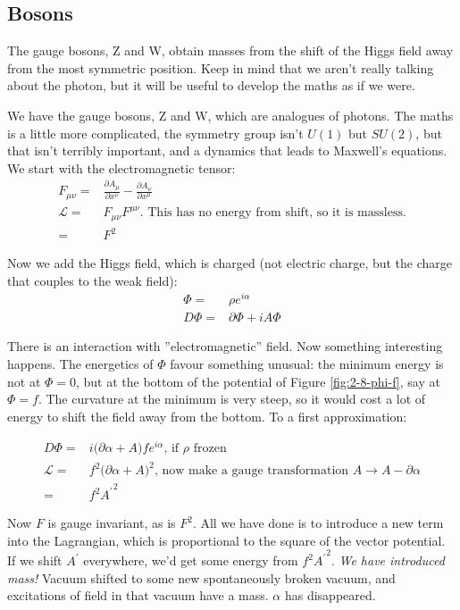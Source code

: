 \documentclass[]{article}
\begin{document}
\subsection{Bosons}

The gauge bosons, Z and W, obtain masses from the shift of the Higgs field away from the most symmetric position. Keep in mind that we aren't really talking about the photon, but it will be useful to develop the maths as if we were.

We have the gauge bosons, Z and W, which are analogues of photons. The maths is a little more complicated, the symmetry group isn't $U(1)$ but $SU(2)$, but that isn't terribly important, and a dynamics that leads to Maxwell's equations. We start with the electromagnetic tensor:
\begin{align*}
	F_{\mu\nu}=&\frac{\partial A_\mu}{\partial x^\nu}-\frac{\partial A_\nu}{\partial x^\mu}\\
	\mathcal{L} =& F_{\mu\nu} F^{\mu\nu} \text{. This has no energy from shift, so it is massless.}\\
	=& F^2
\end{align*}

Now we add the Higgs field, which is charged (not electric charge, but the charge that couples to the weak field):
\begin{align*}
	\Phi =& \rho e^{i \alpha}\\
	D \Phi =& \partial \Phi + i A \Phi 
\end{align*}

There is an interaction with ''electromagnetic'' field. Now something interesting happens. The energetics of $\Phi$ favour something unusual: the minimum energy is not at $\Phi=0$, but at the bottom of the potential of Figure \ref{fig:2-8-phi-f}, say at $\Phi=f$. The curvature at the minimum is very steep, so it would cost a lot of energy to shift the field away from the bottom. To a first approximation:

\begin{align*}
	D \Phi =& i \big( \partial \alpha + A \big) f e^{i \alpha} \text{, if $\rho$ frozen}\\
	\mathcal{L} =& f^2 \big(\partial \alpha + A \big)^2 \text{, now make a gauge transformation $A\rightarrow A - \partial \alpha$}\\
	=& f^2 {A^\prime}^2
\end{align*}

Now $F$ is gauge invariant, as is $F^2$. All we have done is to introduce a new term into the Lagrangian, which is proportional to the square of the vector potential. If we shift $A^\prime$ everywhere, we'd get some energy from $f^2 {A^\prime}^2$. \emph{We have introduced mass!} Vacuum shifted to some new spontaneously broken vacuum, and excitations of field in that vacuum have a mass. $\alpha$ has disappeared.
\end{document}
